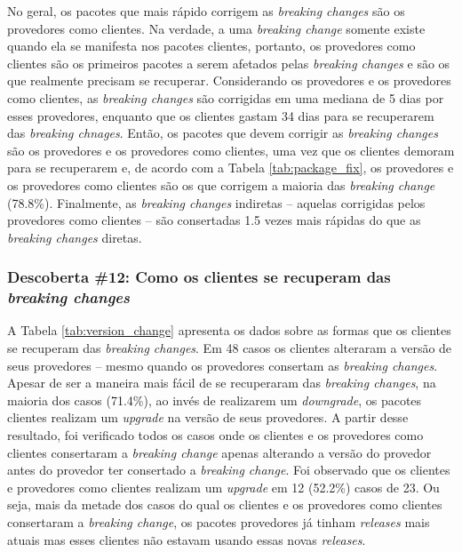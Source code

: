 No geral, os pacotes que mais rápido corrigem as \textit{breaking changes} são os provedores como clientes. Na verdade, a uma \textit{breaking change} somente existe quando ela se manifesta nos pacotes clientes, portanto, os provedores como clientes são os primeiros pacotes a serem afetados pelas \textit{breaking changes} e são os que realmente precisam se recuperar. Considerando os provedores e os provedores como clientes, as \textit{breaking changes} são corrigidas em uma mediana de 5 dias por esses provedores, enquanto que os clientes gastam 34 dias para se recuperarem das \textit{breaking chnages}. Então, os pacotes que devem corrigir as \textit{breaking changes} são os provedores e os provedores como clientes, uma vez que os clientes demoram para se recuperarem e, de acordo com a Tabela \ref{tab:package_fix}, os provedores e os provedores como clientes são os que corrigem a maioria das \textit{breaking change} (78.8\%). Finalmente, as \textit{breaking changes} indiretas -- aquelas corrigidas pelos provedores como clientes -- são consertadas 1.5 vezes mais rápidas do que as \textit{breaking changes} diretas.

\subsubsection{Descoberta \#12: Como os clientes se recuperam das \textit{breaking changes}}

A Tabela \ref{tab:version_change} apresenta os dados sobre as formas que os clientes se recuperam das \textit{breaking changes}. Em 48 casos os clientes alteraram a versão de seus provedores -- mesmo quando os provedores consertam as \textit{breaking changes}. Apesar de ser a maneira mais fácil de se recuperaram das \textit{breaking changes}, na maioria dos casos (71.4\%), ao invés de realizarem um \textit{downgrade}, os pacotes clientes realizam um \textit{upgrade} na versão de seus provedores. A partir desse resultado, foi verificado todos os casos onde os clientes e os provedores como clientes consertaram a \textit{breaking change} apenas alterando a versão do provedor antes do provedor ter consertado a \textit{breaking change}. Foi observado que os clientes e provedores como clientes realizam um \textit{upgrade} em 12 (52.2\%) casos de 23. Ou seja, mais da metade dos casos do qual os clientes e os provedores como clientes consertaram a \textit{breaking change}, os pacotes provedores já tinham \textit{releases} mais atuais mas esses clientes não estavam usando essas novas \textit{releases}.

